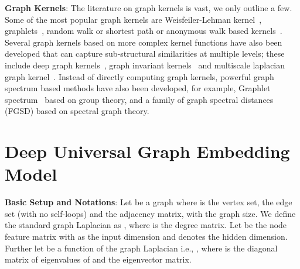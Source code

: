 \documentclass{article}
\begin{document}
\textbf{Graph Kernels}: The literature on graph kernels is vast, we only outline a few. Some of the most popular graph kernels are Weisfeiler-Lehman   kernel~\cite{shervashidze2011weisfeiler}, graphlets~\cite{prvzulj2007biological,shervashidze2009efficient}, random walk or shortest path or anonymous walk based kernels~\cite{kashima2003marginalized,borgwardt2005shortest, ivanov2018anonymous}. Several graph kernels   based on more complex kernel functions have also been developed  that can capture sub-structural similarities at multiple levels; these include deep graph kernels~\cite{yanardag2015deep}, graph invariant  kernels~\cite{orsini2015graph} and  multiscale laplacian graph kernel~\cite{kondor2016multiscale}. Instead of directly computing graph kernels,  powerful  graph spectrum based methods have also been developed, for example,
Graphlet spectrum~\cite{kondor2009graphlet}   based on group theory,  and a family of graph spectral distances (FGSD)   based on spectral graph theory.






































\vspace{-1em}
\section{Deep Universal Graph Embedding Model}\label{sec:model}
\vspace{-0.5em}
\noindent \textbf{Basic Setup and  Notations}: Let    be a graph   where  is the vertex set,  the edge set (with no self-loops) and  the       adjacency matrix, with   the graph size. We define the standard graph Laplacian  as , where  is the degree matrix. Let  be the node feature matrix with  as the input dimension and     denotes the hidden dimension.   Further let  be a function of the graph Laplacian i.e.,  ,  where  is the diagonal matrix  of  eigenvalues of  and  the eigenvector matrix. 
\end{document}
